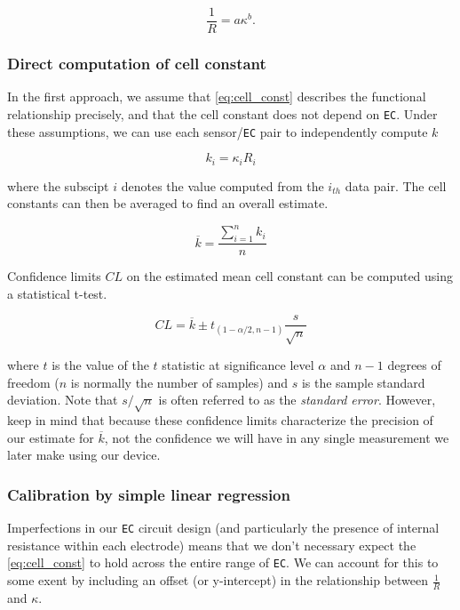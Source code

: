 \begin{equation}\label{eq:ec_power}
	\frac{1}{R}=a\kappa ^b.  
\end{equation}

\subsubsection{Direct computation of cell constant}
In the first approach, we assume that \ref{eq:cell_const} describes the functional relationship precisely, and that the cell constant does not depend on \texttt{EC}.  Under these assumptions, we can use each sensor/\texttt{EC} pair to independently compute $k$

\begin{equation}\label{eq:cell_i}
	k_i=\kappa _i R_i  
\end{equation}

where the subscipt $i$ denotes the value computed from the ${i_{th}}$ data pair.  The cell constants can then be averaged to find an overall estimate. 

\begin{equation}\label{eq:ave_cell_const}
	\overline{k} = \frac{\sum_{i=1}^{n}k_i}{n}
\end{equation}

Confidence limits $CL$ on the estimated mean cell constant can be computed using a statistical t-test. 

\begin{equation}\label{eq:ec_power}
	CL = \overline{k} \pm t_{({1-\alpha/2,n-1})}\frac{s}{\sqrt{n}}
\end{equation}

where $t$ is the value of the $t$ statistic at significance level $\alpha$ and $n-1$ degrees of freedom ($n$ is normally the number of samples) and $s$ is the sample standard deviation. Note that $s/\sqrt{n}$ is often referred to as the \emph{standard error}.  However, keep in mind that because these confidence limits characterize the precision of our estimate for $\overline{k}$, not the confidence we will have in any single measurement we later make using our device.
 
\subsubsection{Calibration by simple linear regression}

Imperfections in our \texttt{EC} circuit design (and particularly the presence of internal resistance within each electrode) means that we don't necessary expect the \ref{eq:cell_const} to hold across the entire range of \texttt{EC}. We can account for this to some exent by including an offset (or y-intercept) in the relationship between $\frac{1}{R}$ and $\kappa$.

